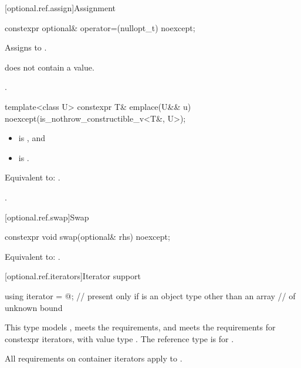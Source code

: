 [optional.ref.assign]{Assignment}

\begin{itemdecl}
constexpr optional& operator=(nullopt_t) noexcept;
\end{itemdecl}

\begin{itemdescr}
\pnum
\effects
Assigns  to .

\pnum
\ensures
{} does not contain a value.

\pnum
\returns
{}.
\end{itemdescr}

\begin{itemdecl}
template<class U>
  constexpr T& emplace(U&& u) noexcept(is_nothrow_constructible_v<T&, U>);
\end{itemdecl}

\begin{itemdescr}
\pnum
\constraints
\begin{itemize}
\item {} is , and
\item {} is .
\end{itemize}

\pnum
\effects
Equivalent to: .

\pnum
\returns
{}.
\end{itemdescr}

[optional.ref.swap]{Swap}

\begin{itemdecl}
constexpr void swap(optional& rhs) noexcept;
\end{itemdecl}

\begin{itemdescr}
\pnum
\effects
Equivalent to: .
\end{itemdescr}

[optional.ref.iterators]{Iterator support}

\begin{itemdecl}
using iterator = @\impdefnc@;        // present only if  is an object type other than an array
                                                // of unknown bound
\end{itemdecl}

\begin{itemdescr}
\pnum
This type
models ,
meets the  requirements,
and meets the requirements for constexpr iterators,
with value type .
The reference type is  for .

\pnum
All requirements on container iterators apply to
.
\end{itemdescr}

